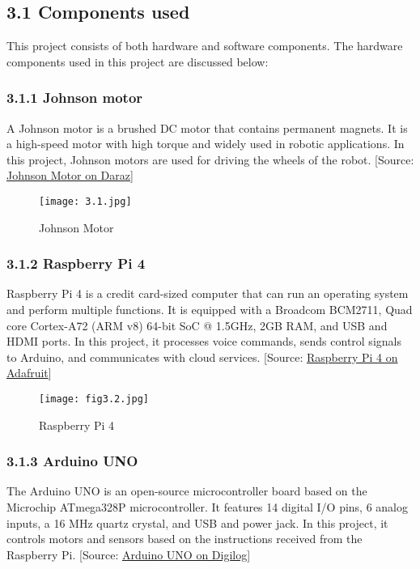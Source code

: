 \subsection*{3.1 Components used}
This project consists of both hardware and software components. The hardware components used in this project are discussed below:

\subsubsection*{3.1.1 Johnson motor}
A Johnson motor is a brushed DC motor that contains permanent magnets. It is a high-speed motor with high torque and widely used in robotic applications. In this project, Johnson motors are used for driving the wheels of the robot. [Source: \href{https://www.daraz.com.np/products/johnson-motor-metal-gear-300rpm-i129797381.html}{Johnson Motor on Daraz}]

\begin{figure}[H]
    \centering
    \texttt{[image: 3.1.jpg]}
    \caption{Johnson Motor}
    \label{fig:3.1}
\end{figure}

\subsubsection*{3.1.2 Raspberry Pi 4}
Raspberry Pi 4 is a credit card-sized computer that can run an operating system and perform multiple functions. It is equipped with a Broadcom BCM2711, Quad core Cortex-A72 (ARM v8) 64-bit SoC @ 1.5GHz, 2GB RAM, and USB and HDMI ports. In this project, it processes voice commands, sends control signals to Arduino, and communicates with cloud services. [Source: \href{https://www.adafruit.com/product/4292}{Raspberry Pi 4 on Adafruit}]

\begin{figure}[H]
    \centering
    \texttt{[image: fig3.2.jpg]}
    \caption{Raspberry Pi 4}
    \label{fig:3.2}
\end{figure}

\subsubsection*{3.1.3 Arduino UNO}
The Arduino UNO is an open-source microcontroller board based on the Microchip ATmega328P microcontroller. It features 14 digital I/O pins, 6 analog inputs, a 16 MHz quartz crystal, and USB and power jack. In this project, it controls motors and sensors based on the instructions received from the Raspberry Pi. [Source: \href{https://digilog.pk/products/arduino-uno-kit-in-pakistan}{Arduino UNO on Digilog}]

